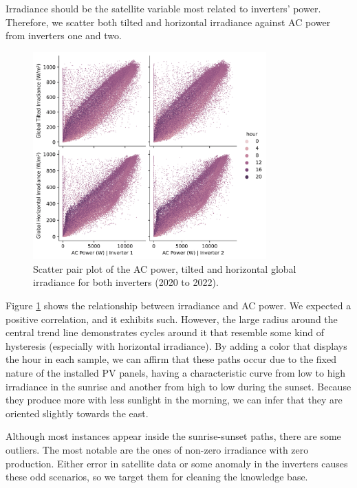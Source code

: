Irradiance should be the satellite variable most related to inverters' power. Therefore, we scatter both tilted and horizontal irradiance against AC power from inverters one and two.

\begin{figure}[h!]
    \centering
    \includegraphics[width=0.8\textwidth]{figures/chapter5/analysis/08_power_irrad_pairplot_scatter_kb-1.png}
    \caption{Scatter pair plot of the AC power, tilted and horizontal global irradiance for both inverters (2020 to 2022).}
    \label{fig:eda_power_irrad_pair_kb}
\end{figure}

Figure \ref{fig:eda_power_irrad_pair_kb} shows the relationship between irradiance and AC power. We expected a positive correlation, and it exhibits such. However, the large radius around the central trend line demonstrates cycles around it that resemble some kind of hysteresis (especially with horizontal irradiance). By adding a color that displays the hour in each sample, we can affirm that these paths occur due to the fixed nature of the installed PV panels, having a characteristic curve from low to high irradiance in the sunrise and another from high to low during the sunset. Because they produce more with less sunlight in the morning, we can infer that they are oriented slightly towards the east.

Although most instances appear inside the sunrise-sunset paths, there are some outliers. The most notable are the ones of non-zero irradiance with zero production. Either error in satellite data or some anomaly in the inverters causes these odd scenarios, so we target them for cleaning the knowledge base.

